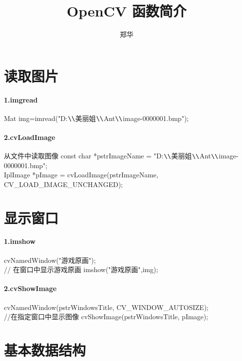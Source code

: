 \documentclass[UTF8,a4paper,8pt]{ctexart}
\author{郑华}
\title{OpenCV 函数简介}
\begin{document}
 
 	\maketitle
 		
\section{读取图片}
	\paragraph{1.imgread}Mat img=imread("D:$ \verb|\\|$美丽姐$ \verb|\\|$Ant$ \verb|\\|$image-0000001.bmp");  
	\paragraph{2.cvLoadImage}从文件中读取图像   const char *pstrImageName = "D:$ \verb|\\|$美丽姐$ \verb|\\|$Ant$ \verb|\\|$image-0000001.bmp";\\
	IplImage *pImage = cvLoadImage(pstrImageName, CV\_LOAD\_IMAGE\_UNCHANGED);  
	
	
\section{显示窗口}
	\paragraph{1.imshow}cvNamedWindow("游戏原画");  \\
	// 在窗口中显示游戏原画  
	imshow("游戏原画",img);  
	\paragraph{2.cvShowImage}	 cvNamedWindow(pstrWindowsTitle, CV\_WINDOW\_AUTOSIZE);  \\
	//在指定窗口中显示图像  
	cvShowImage(pstrWindowsTitle, pImage); 
	
	
	
\section{基本数据结构} 
\end{document}
